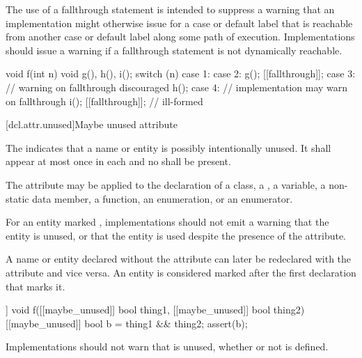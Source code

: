 \pnum
\begin{note}
The use of a fallthrough statement is intended to suppress
a warning that an implementation might otherwise issue
for a case or default label that is reachable
from another case or default label along some path of execution.
Implementations should issue a warning
if a fallthrough statement is not dynamically reachable.
\end{note}

\pnum
\begin{example}
\begin{codeblock}
void f(int n) {
  void g(), h(), i();
  switch (n) {
  case 1:
  case 2:
    g();
    [[fallthrough]];
  case 3:                       // warning on fallthrough discouraged
    h();
  case 4:                       // implementation may warn on fallthrough
    i();
    [[fallthrough]];            // ill-formed
  }
}
\end{codeblock}
\end{example}

[dcl.attr.unused]{Maybe unused attribute}%

\pnum
The  
indicates that a name or entity is possibly intentionally unused.
It shall appear at most once in each  and
no  shall be present.

\pnum
The attribute may be applied to the declaration of a class,
a , a variable, a non-static data member,
a function, an enumeration, or an enumerator.

\pnum
\begin{note}
For an entity marked , implementations
should not emit a warning that the entity is unused, or
that the entity is used despite the presence of the attribute.
\end{note}

\pnum
A name or entity declared without the  attribute
can later be redeclared with the attribute
and vice versa.
An entity is considered marked
after the first declaration that marks it.

\pnum
\begin{example}
\begin{codeblock}
[[maybe_unused]] void f([[maybe_unused]] bool thing1,
                        [[maybe_unused]] bool thing2) {
  [[maybe_unused]] bool b = thing1 && thing2;
  assert(b);
}
\end{codeblock}
Implementations should not warn that  is unused,
whether or not  is defined.
\end{example}

